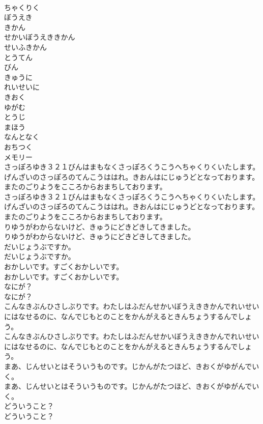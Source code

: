 \documentclass[8pt]{extreport}
\begin{document}
\begin{CJK}{UTF8}{min}
\\	ちゃくりく
\\	ぼうえき
\\	きかん
\\	せかいぼうえききかん
\\	せいふきかん
\\	とうてん
\\	びん
\\	きゅうに
\\	れいせいに
\\	きおく
\\	ゆがむ
\\	とうじ
\\	まほう
\\	なんとなく
\\	おちつく
\\	メモリー
\\	さっぽろゆき３２１びんはまもなくさっぽろくうこうへちゃくりくいたします。げんざいのさっぽろのてんこうははれ。きおんはにじゅうどとなっております。またのごりようをこころからおまちしております。
\\	さっぽろゆき３２１びんはまもなくさっぽろくうこうへちゃくりくいたします。げんざいのさっぽろのてんこうははれ。きおんはにじゅうどとなっております。またのごりようをこころからおまちしております。
\\	りゆうがわからないけど、きゅうにどきどきしてきました。
\\	りゆうがわからないけど、きゅうにどきどきしてきました。
\\	だいじょうぶですか。
\\	だいじょうぶですか。
\\	おかしいです。すごくおかしいです。
\\	おかしいです。すごくおかしいです。
\\	なにが？
\\	なにが？
\\	こんなきぶんひさしぶりです。わたしはふだんせかいぼうえききかんでれいせいにはなせるのに、なんでじもとのことをかんがえるときんちょうするんでしょう。
\\	こんなきぶんひさしぶりです。わたしはふだんせかいぼうえききかんでれいせいにはなせるのに、なんでじもとのことをかんがえるときんちょうするんでしょう。
\\	まあ、じんせいとはそういうものです。じかんがたつほど、きおくがゆがんでいく。
\\	まあ、じんせいとはそういうものです。じかんがたつほど、きおくがゆがんでいく。
\\	どういうこと？
\\	どういうこと？

\end{CJK}
\end{document}
